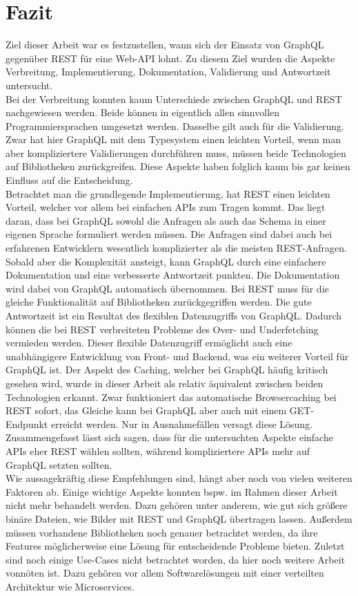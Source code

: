 \chapter{Fazit}

Ziel dieser Arbeit war es festzustellen, wann sich der Einsatz von GraphQL gegenüber \ac{REST} für eine Web-API lohnt. Zu diesem Ziel wurden die Aspekte Verbreitung, Implementierung, Dokumentation, Validierung und Antwortzeit untersucht.\\
Bei der Verbreitung konnten kaum Unterschiede zwischen GraphQL und \ac{REST} nachgewiesen werden. Beide können in eigentlich allen sinnvollen Programmiersprachen umgesetzt werden. Dasselbe gilt auch für die Validierung. Zwar hat hier GraphQL mit dem Typesystem einen leichten Vorteil, wenn man aber kompliziertere Validierungen durchführen muss, müssen beide Technologien auf Bibliotheken zurückgreifen. Diese Aspekte haben folglich kaum bis gar keinen Einfluss auf die Entscheidung.\\
Betrachtet man die grundlegende Implementierung, hat \ac{REST} einen leichten Vorteil, welcher vor allem bei einfachen APIs zum Tragen kommt. Das liegt daran, dass bei GraphQL sowohl die Anfragen als auch das Schema in einer eigenen Sprache formuliert werden müssen. Die Anfragen sind dabei auch bei erfahrenen Entwicklern wesentlich komplizierter als die meisten REST-Anfragen.\\
Sobald aber die Komplexität ansteigt, kann GraphQL durch eine einfachere Dokumentation und eine verbesserte Antwortzeit punkten. Die Dokumentation wird dabei von GraphQL automatisch übernommen. Bei \ac{REST} muss für die gleiche Funktionalität auf Bibliotheken zurückgegriffen werden. Die gute Antwortzeit ist ein Resultat des flexiblen Datenzugriffs von GraphQL. Dadurch können die bei \ac{REST} verbreiteten Probleme des Over- und Underfetching vermieden werden. Dieser flexible Datenzugriff ermöglicht auch eine unabhängigere Entwicklung von Front- und Backend, was ein weiterer Vorteil für GraphQL ist. Der Aspekt des Caching, welcher bei GraphQL häufig kritisch gesehen wird, wurde in dieser Arbeit als relativ äquivalent zwischen beiden Technologien erkannt. Zwar funktioniert das automatische Browsercaching bei \ac{REST} sofort, das Gleiche kann bei GraphQL aber auch mit einem GET-Endpunkt erreicht werden. Nur in Ausnahmefällen versagt diese Lösung.\\
Zusammengefasst lässt sich sagen, dass für die untersuchten Aspekte einfache APIs eher \ac{REST} wählen sollten, während kompliziertere APIs mehr auf GraphQL setzten sollten.\\
Wie aussagekräftig diese Empfehlungen sind, hängt aber noch von vielen weiteren Faktoren ab. Einige wichtige Aspekte konnten bspw. im Rahmen dieser Arbeit nicht mehr behandelt werden. Dazu gehören unter anderem, wie gut sich größere binäre Dateien, wie Bilder mit \ac{REST} und GraphQL übertragen lassen. Außerdem müssen vorhandene Bibliotheken noch genauer betrachtet werden, da ihre Features möglicherweise eine Lösung für entscheidende Probleme bieten. Zuletzt sind noch einige Use-Cases nicht betrachtet worden, da hier noch weitere Arbeit vonnöten ist. Dazu gehören vor allem Softwarelösungen mit einer verteilten Architektur wie Microservices.\\